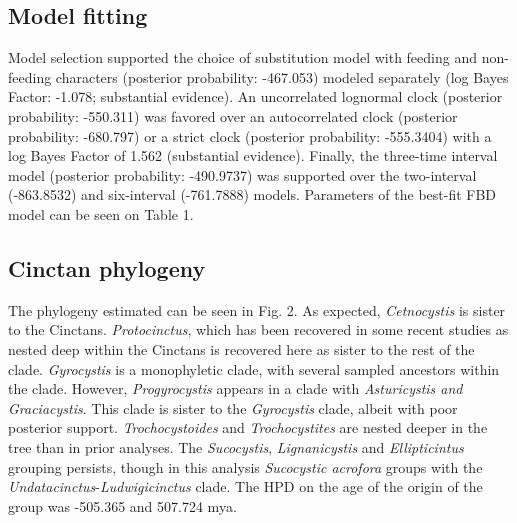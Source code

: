 \documentclass{article}
\begin{document}
\subsection{Model fitting}

Model selection supported the choice of substitution model with feeding and non-feeding characters (posterior probability: -467.053) modeled separately (log Bayes Factor: -1.078; substantial evidence).
An uncorrelated lognormal clock (posterior probability: -550.311) was favored over an autocorrelated clock (posterior probability: -680.797) or a strict clock (posterior probability: -555.3404) with a log Bayes Factor of 1.562 (substantial evidence).
Finally, the three-time interval model (posterior probability: -490.9737) was supported over the two-interval (-863.8532) and six-interval (-761.7888) models. 
Parameters of the best-fit FBD model can be seen on Table 1.

\subsection{Cinctan phylogeny}

The phylogeny estimated can be seen in Fig. 2.
As expected, \textit{Cetnocystis} is sister to the Cinctans. 
\textit{Protocinctus}, which has been recovered in some recent studies as nested deep within the Cinctans is recovered here as sister to the rest of the clade. 
\textit{Gyrocystis} is a monophyletic clade, with several sampled ancestors within the clade. 
However, \textit{Progyrocystis} appears in a clade with \textit{Asturicystis and Graciacystis}. 
This clade is sister to the \textit{Gyrocystis} clade, albeit with poor posterior support. 
\textit{Trochocystoides} and \textit{Trochocystites} are nested deeper in the tree than in prior analyses.
The \textit{Sucocystis}, \textit{Lignanicystis} and \textit{Ellipticintus} grouping persists, though in this analysis \textit{Sucocystic acrofora} groups with the \textit{Undatacinctus}-\textit{Ludwigicinctus} clade.
The HPD on the age of the origin of the group was -505.365 and 507.724 mya.
\end{document}
